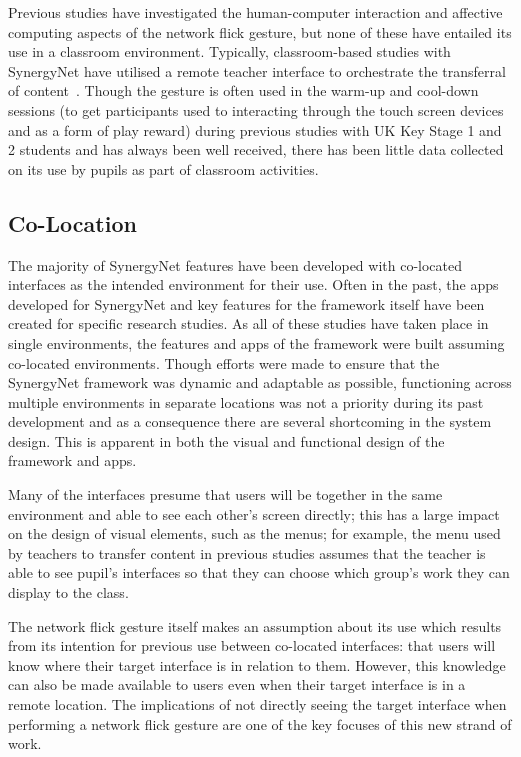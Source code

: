 \documentclass[a4paper,11pt]{article}
\begin{document}
Previous studies have investigated the human-computer interaction and affective computing aspects of the network flick gesture, but none of these have entailed its use in a classroom environment.
Typically, classroom-based studies with SynergyNet have utilised a remote teacher interface to orchestrate the transferral of content~\cite{joycegibbons:2016}.
Though the gesture is often used in the warm-up and cool-down sessions (to get participants used to interacting through the touch screen devices and as a form of play reward) during previous studies with UK Key Stage 1 and 2 students and has always been well received, there has been little data collected on its use by pupils as part of classroom activities.

\subsection{Co-Location}

The majority of SynergyNet features have been developed with co-located interfaces as the intended environment for their use.
Often in the past, the apps developed for SynergyNet and key features for the framework itself have been created for specific research studies.
As all of these studies have taken place in single environments, the features and apps of the framework were built assuming co-located environments.
Though efforts were made to ensure that the SynergyNet framework was dynamic and adaptable as possible, functioning across multiple environments in separate locations was not a priority during its past development and as a consequence there are several shortcoming in the system design.
This is apparent in both the visual and functional design of the framework and apps.

Many of the interfaces presume that users will be together in the same environment and able to see each other's screen directly; this has a large impact on the design of visual elements, such as the menus; for example, the menu used by teachers to transfer content in previous studies assumes that the teacher is able to see pupil's interfaces so that they can choose which group's work they can display to the class.

The network flick gesture itself makes an assumption about its use which results from its intention for previous use between co-located interfaces: that users will know where their target interface is in relation to them.
However, this knowledge can also be made available to users even when their target interface is in a remote location.
The implications of not directly seeing the target interface when performing a network flick gesture are one of the key focuses of this new strand of work.
\end{document}
